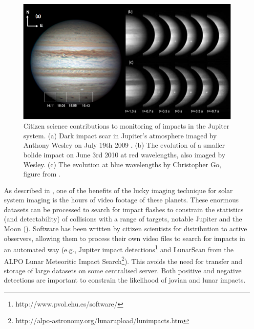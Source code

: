 \documentclass{ar2e}
\begin{document}
\begin{figure}[!ht]
\centering\includegraphics[width=\linewidth]{figs/jupiter-impacts.png}
\caption{Citizen science contributions to monitoring of impacts in the Jupiter
system. (a) Dark impact scar in Jupiter's atmosphere imaged by Anthony
Wesley on July 19th 2009 \citep{Sanchez-LavegaEtal2010}. (b) The
evolution of a smaller bolide impact on June 3rd 2010 at red
wavelengths, also imaged by Wesley. (c) The evolution at blue
wavelengths by Christopher Go, figure from \citet{HuesoEtal2010}.}
\label{fig:jupiter-impacts}
\end{figure}


As described in \Sref{}, one of the benefits of the lucky imaging
technique for solar system imaging is the hours of video footage of these
planets.  These enormous datasets can be processed to search for impact
flashes to constrain the statistics (and detectability) of collisions with a
range of targets, notable Jupiter and the Moon
().  Software has been written by
citizen scientists for distribution to active observers, allowing them to
process their own video files to search for impacts in an automated way (e.g.,
Jupiter impact detections\footnote{http://www.pvol.ehu.es/software/} and
LunarScan from the ALPO Lunar Meteoritic Impact
Search\footnote{http://alpo-astronomy.org/lunarupload/lunimpacts.htm}).  This
avoids the need for transfer and storage of large datasets on some centralised
server.  Both positive and negative detections are important to constrain the
likelihood of jovian and lunar impacts.
\end{document}
